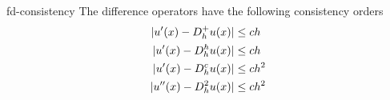 \begin{Lemma}{fd-consistency}
  The difference operators have the following consistency orders
  \begin{align}
    \label{eq:fd-consistency:1}
    \lvert u'(x)-D^+_hu(x)\rvert & \le c h \\
    \label{eq:fd-consistency:2}
    \lvert u'(x)-D^h_hu(x)\rvert & \le c h \\
    \label{eq:fd-consistency:3}
    \lvert u'(x)-D^c_hu(x)\rvert & \le c h^2 \\
    \label{eq:fd-consistency:4}
    \lvert u''(x)-D^2_hu(x)\rvert & \le c h^2
  \end{align}
\end{Lemma}

